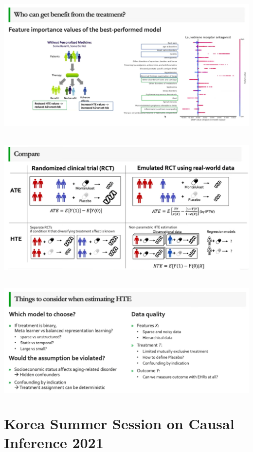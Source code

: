 \documentclass[
]{book}
\theoremstyle{definition}
\theoremstyle{definition}
\theoremstyle{definition}
\theoremstyle{definition}
\theoremstyle{remark}
\begin{document}
\strut \\

\includegraphics{figures/19.png}

\strut \\

\includegraphics{figures/20.png}

\strut \\

\includegraphics{figures/21.png}

\hypertarget{korea-summer-session-on-causal-inference-2021}{%
\chapter{Korea Summer Session on Causal Inference 2021}\label{korea-summer-session-on-causal-inference-2021}}
\end{document}
